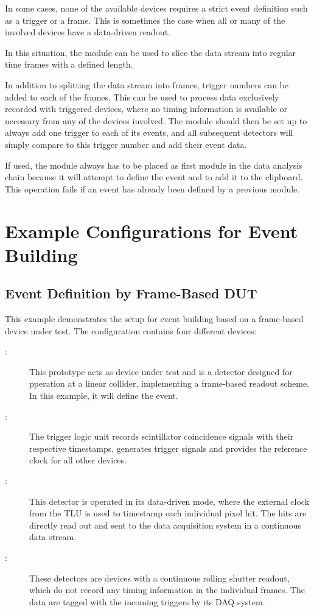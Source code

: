 In some cases, none of the available devices requires a strict event definition such as a trigger or a frame.
This is sometimes the case when all or many of the involved devices have a data-driven readout.

In this situation, the  module can be used to slice the data stream into regular time frames with a defined length.

In addition to splitting the data stream into frames, trigger numbers can be added to each of the frames.
This can be used to process data exclusively recorded with triggered devices, where no timing information is available or necessary from any of the devices involved.
The module should then be set up to always add one trigger to each of its events, and all subsequent detectors will simply compare to this trigger number and add their event data.

If used, the  module always has to be placed as first module in the data analysis chain because it will attempt to define the event and to add it to the clipboard. This operation fails if an event has already been defined by a previous module.


\section{Example Configurations for Event Building}

\subsection{Event Definition by Frame-Based DUT}

This example demonstrates the setup for event building based on a frame-based device under test.
The configuration contains four different devices:
\begin{description}
        \item[:] This prototype acts as device under test and is a detector designed for pperation at a linear collider, implementing a frame-based readout scheme. In this example, it will define the event.
        \item[:] The trigger logic unit records scintillator coincidence signals with their respective timestamps, generates trigger signals and provides the reference clock for all other devices.
        \item[:] This detector is operated in its data-driven mode, where the external clock from the TLU is used to timestamp each individual pixel hit. The hits are directly read out and sent to the data acquisition system in a continuous data stream.
        \item[:] These detectors are devices with a continuous rolling shutter readout, which do not record any timing information in the individual frames. The data are tagged with the incoming triggers by its DAQ system.
\end{description}

